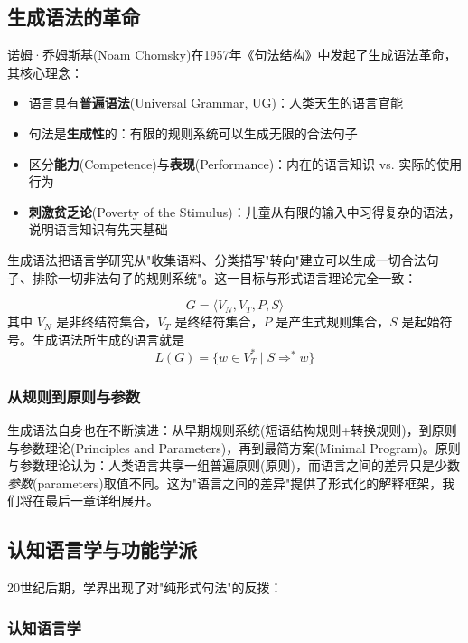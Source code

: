 \subsection{生成语法的革命}

诺姆·乔姆斯基(Noam Chomsky)在1957年《句法结构》中发起了生成语法革命，其核心理念：
\begin{itemize}
    \item 语言具有\textbf{普遍语法}(Universal Grammar, UG)：人类天生的语言官能
    \item 句法是\textbf{生成性}的：有限的规则系统可以生成无限的合法句子
    \item 区分\textbf{能力}(Competence)与\textbf{表现}(Performance)：内在的语言知识 vs. 实际的使用行为
    \item \textbf{刺激贫乏论}(Poverty of the Stimulus)：儿童从有限的输入中习得复杂的语法，说明语言知识有先天基础
\end{itemize}

生成语法把语言学研究从"收集语料、分类描写"转向"建立可以生成一切合法句子、排除一切非法句子的规则系统"。这一目标与形式语言理论完全一致：

\begin{equation}
    G = \langle V_N, V_T, P, S \rangle
\end{equation}
其中 $V_N$ 是非终结符集合，$V_T$ 是终结符集合，$P$ 是产生式规则集合，$S$ 是起始符号。生成语法所生成的语言就是
\begin{equation}
    L(G) = \{ w \in V_T^* \mid S \Rightarrow^* w \}
\end{equation}

\subsubsection{从规则到原则与参数}

生成语法自身也在不断演进：从早期规则系统(短语结构规则+转换规则)，到原则与参数理论(Principles and Parameters)，再到最简方案(Minimal Program)。原则与参数理论认为：人类语言共享一组普遍原则(原则)，而语言之间的差异只是少数\emph{参数}(parameters)取值不同。这为"语言之间的差异"提供了形式化的解释框架，我们将在最后一章详细展开。

\subsection{认知语言学与功能学派}

20世纪后期，学界出现了对"纯形式句法"的反拨：

\subsubsection{认知语言学}

